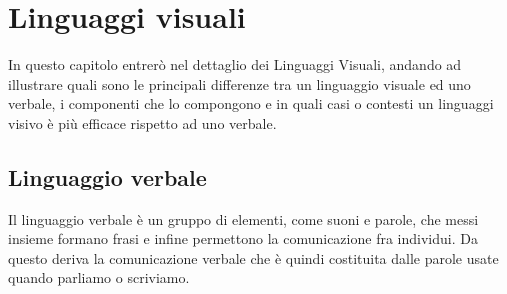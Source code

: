 ﻿\chapter{Linguaggi visuali}

    In questo capitolo entrerò nel dettaglio dei Linguaggi Visuali, andando ad illustrare quali sono le principali differenze tra un linguaggio visuale ed uno verbale, i componenti che lo compongono e in quali casi o contesti un linguaggi visivo è più efficace rispetto ad uno verbale.

    \section{Linguaggio verbale}
        Il linguaggio verbale è un gruppo di elementi, come suoni e parole, che messi insieme formano frasi e infine permettono la comunicazione fra individui. Da questo deriva la comunicazione verbale che è quindi costituita dalle parole usate quando parliamo o scriviamo.


